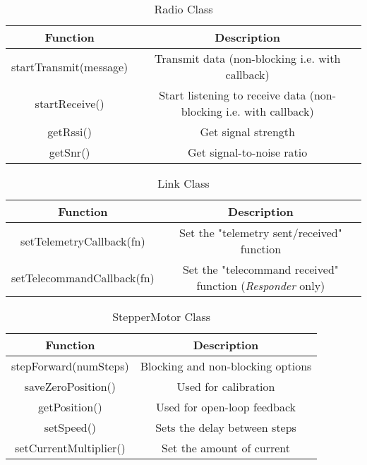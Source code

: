 \begin{table}[!htb]
  \centering
  \caption{Radio Class}
  \renewcommand{\arraystretch}{1.2}
  \begin{tabular}{ |c|c| }
  \hline
  \textbf{Function}        & \textbf{Description}    \\
  \hline
    startTransmit(message)              & Transmit data (non-blocking i.e. with callback) \\
    startReceive()                      & Start listening to receive data (non-blocking i.e. with callback) \\
    getRssi()                           & Get signal strength \\
    getSnr()                            & Get signal-to-noise ratio \\
  \hline
  \end{tabular}
  \label{tab:radioUML}
\end{table}

\begin{table}[!htb]
  \centering
  \caption{Link Class}
  \renewcommand{\arraystretch}{1.2}
  \begin{tabular}{ |c|c| }
  \hline
  \textbf{Function}        & \textbf{Description}    \\
  \hline
  setTelemetryCallback(fn)                    & Set the "telemetry sent/received" function  \\
  setTelecommandCallback(fn)                  & Set the "telecommand received" function (\textit{Responder} only) \\
  \hline
  \end{tabular}
  \label{tab:linkUML}
\end{table}

\begin{table}[!htb]
  \centering
  \caption{StepperMotor Class}
  \renewcommand{\arraystretch}{1.2}
  \begin{tabular}{ |c|c| }
  \hline
  \textbf{Function}        & \textbf{Description}    \\
  \hline
    stepForward(numSteps)         & Blocking and non-blocking options \\
    saveZeroPosition()            & Used for calibration \\
    getPosition()                 & Used for open-loop feedback \\
    setSpeed()                    & Sets the delay between steps \\
    setCurrentMultiplier()        & Set the amount of current \\
  \hline
  \end{tabular}
  \label{tab:stepperMotorUML}
\end{table}

